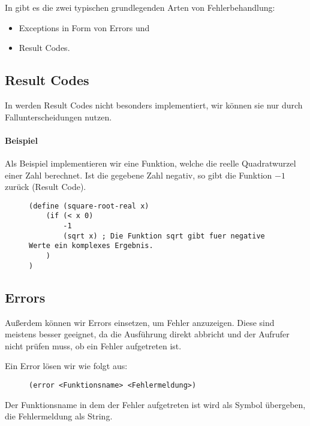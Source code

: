 
In \racketText gibt es die zwei typischen grundlegenden Arten von Fehlerbehandlung:
\begin{itemize}
	\item Exceptions in Form von Errors und
	\item Result Codes.
\end{itemize}

\subsection{Result Codes}
	
	In \racketText werden Result Codes nicht besonders implementiert, wir können sie nur durch Fallunterscheidungen nutzen.
	
	\paragraph{Beispiel}
		Als Beispiel implementieren wir eine Funktion, welche die reelle Quadratwurzel einer Zahl berechnet. Ist die gegebene Zahl negativ, so gibt die Funktion \(-1\) zurück (Result Code).
		
		\begin{figure}[H]
			\centering
			\begin{lstlisting}[language = Racket]
(define (square-root-real x)
	(if (< x 0)
		-1
		(sqrt x) ; Die Funktion sqrt gibt fuer negative Werte ein komplexes Ergebnis.
	)
)
\end{lstlisting}
		\end{figure}

\subsection{Errors}
	
	Außerdem können wir Errors einsetzen, um Fehler anzuzeigen. Diese sind meistens besser geeignet, da die Ausführung direkt abbricht und der Aufrufer nicht prüfen muss, ob ein Fehler aufgetreten ist.
	
	Ein Error lösen wir wie folgt aus:
	\begin{figure}[H]
		\centering
		\lstinline[language = Racket]|(error <Funktionsname> <Fehlermeldung>)|
	\end{figure}
	Der Funktionsname in dem der Fehler aufgetreten ist wird als Symbol übergeben, die Fehlermeldung als String.
	
